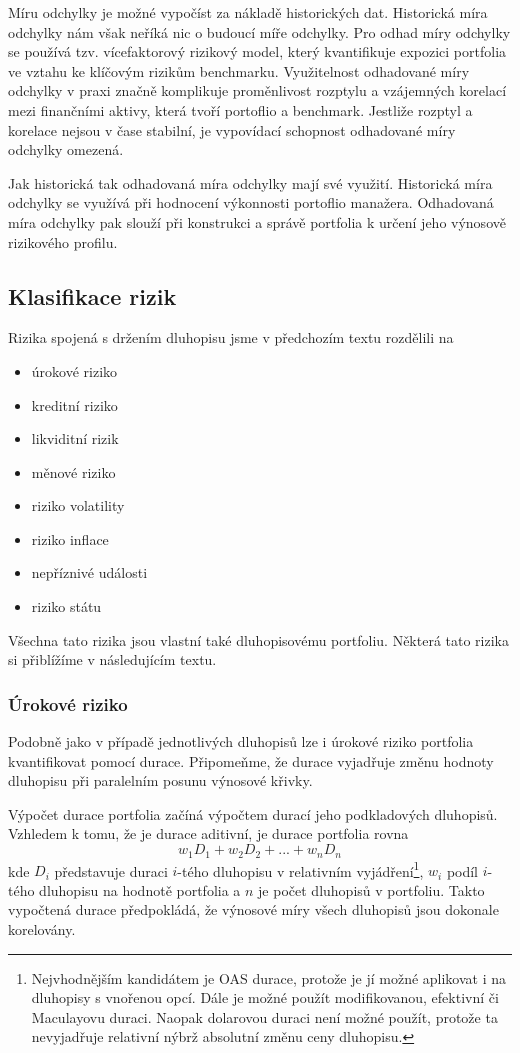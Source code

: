 \documentclass[a4paper]{book}
\begin{document}
Míru odchylky je možné vypočíst za nákladě historických dat. Historická míra odchylky nám však neříká nic o budoucí míře odchylky. Pro odhad míry odchylky se používá tzv. vícefaktorový rizikový model, který kvantifikuje expozici portfolia ve vztahu ke klíčovým rizikům benchmarku. Využitelnost odhadované míry odchylky v praxi značně komplikuje proměnlivost rozptylu a vzájemných korelací mezi finančními aktivy, která tvoří portoflio a benchmark. Jestliže rozptyl a korelace nejsou v čase stabilní, je vypovídací schopnost odhadované míry odchylky omezená.

Jak historická tak odhadovaná míra odchylky mají své využití. Historická míra odchylky se využívá při hodnocení výkonnosti portoflio manažera. Odhadovaná míra odchylky pak slouží při konstrukci a správě portfolia k určení jeho výnosově rizikového profilu.

\subsection{Klasifikace rizik}

Rizika spojená s držením dluhopisu jsme v předchozím textu rozdělili na
\begin{itemize}
\item úrokové riziko
\item kreditní riziko
\item likviditní rizik
\item měnové riziko
\item riziko volatility
\item riziko inflace
\item nepříznivé události
\item riziko státu
\end{itemize}
Všechna tato rizika jsou vlastní také dluhopisovému portfoliu. Některá tato rizika si přiblížíme v následujícím textu.

\subsubsection{Úrokové riziko}

Podobně jako v případě jednotlivých dluhopisů lze i úrokové riziko portfolia kvantifikovat pomocí durace. Připomeňme, že durace vyjadřuje změnu hodnoty dluhopisu při paralelním posunu výnosové křivky.

Výpočet durace portfolia začíná výpočtem durací jeho podkladových dluhopisů. Vzhledem k tomu, že je durace aditivní, je durace portfolia rovna
\begin{equation*}
w_1 D_1 + w_2 D_2 + ... + w_n D_n
\end{equation*}
kde $D_i$ představuje duraci $i$-tého dluhopisu v relativním vyjádření\footnote{Nejvhodnějším kandidátem je OAS durace, protože je jí možné aplikovat i na dluhopisy s vnořenou opcí. Dále je možné použít modifikovanou, efektivní či Maculayovu duraci. Naopak dolarovou duraci není možné použít, protože ta nevyjadřuje relativní nýbrž absolutní změnu ceny dluhopisu.}, $w_i$ podíl $i$-tého dluhopisu na hodnotě portfolia a $n$ je počet dluhopisů v portfoliu. Takto vypočtená durace předpokládá, že výnosové míry všech dluhopisů jsou dokonale korelovány.
\end{document}

